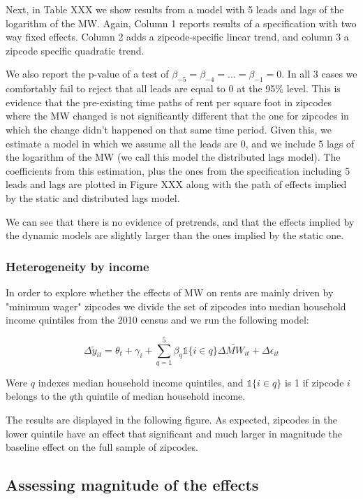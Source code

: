 Next, in Table XXX we show results from a model with 5 leads and lags of the logarithm of the MW. Again, Column 1 reports results of a specification with two way fixed effects. Column 2 adds a zipcode-specific linear trend, and column 3 a zipcode specific quadratic trend. 


We also report the p-value of a test of $\beta_{-5} = \beta_{-4} = ... = \beta_{-1} = 0$. In all 3 cases we comfortably fail to reject that all leads are equal to 0 at the 95\% level. This is evidence that the pre-existing time paths of rent per square foot in zipcodes where the MW changed is not significantly different that the one for zipcodes in which the change didn't happened on that same time period. Given this, we estimate a model in which we assume all the leads are 0, and we include 5 lags of the logarithm of the MW (we call this model the distributed lags model). The coefficients from this estimation, plus the ones from the specification including 5 leads and lags are plotted in Figure XXX along with the path of effects implied by the static and distributed lags model. 


We can see that there is no evidence of pretrends, and that the effects implied by the dynamic models are slightly larger than the ones implied by the static one.  


\subsubsection{Heterogeneity by income}

In order to explore whether the effects of MW on rents are mainly driven by "minimum wager" zipcodes we divide the set of zipcodes into median household income quintiles from the 2010 census and we run the following model:

\begin{equation}\label{eq:diff_main}
        \Delta \tilde{y}_{it} = \theta_t + \gamma_i + \sum_{q=1}^5 \beta_q \mathds{1}\{i\in q\} \Delta \tilde{MW}_{it}+ \Delta \epsilon_{it}
\end{equation}

Were $q$ indexes median household income quintiles, and $\mathds{1}\{i\in q\}$ is 1 if zipcode $i$ belongs to the $q$th quintile of median household income. 

The results are displayed in the following figure. As expected, zipcodes in the lower quintile have an effect that significant and much larger in magnitude the baseline effect on the full sample of zipcodes.   

\subsection{Assessing magnitude of the effects}\label{subsec:results/magnitude}


